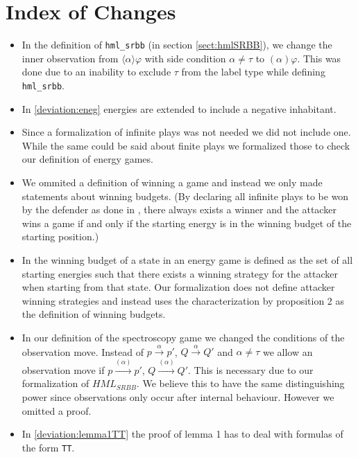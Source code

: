\section{Index of Changes}
\begin{itemize}
    \item In the definition of \texttt{hml\_srbb} (in section \ref{sect:hmlSRBB}), we change the inner observation from
      $\langle\alpha\rangle\varphi$ with side condition $\alpha \neq \tau$ to $(\alpha)\varphi$.
      This was done due to an inability to exclude $\tau$ from the label type while defining \texttt{hml\_srbb}. 
    \item In \ref{deviation:eneg} energies are extended to include a negative inhabitant. 
    \item Since a formalization of infinite plays was not needed we did not include one. While the 
same could be said about finite plays we formalized those to check our definition of energy games.
    \item We ommited a definition of winning a game and instead we only made statements about winning budgets. 
(By declaring all infinite plays to be won by the defender as done in \cite{bisping2023lineartimebranchingtime}, 
there always exists a winner and the attacker wins a game if and only if the starting energy is in the winning budget of the starting position.)
    \item In \cite{bisping2023lineartimebranchingtime} the winning budget of a state in an energy game 
is defined as the set of all starting energies such that there exists a winning strategy for the attacker 
when starting from that state. Our formalization does not define attacker winning strategies and instead 
uses the characterization by proposition 2 \cite[p. 9]{bisping2023lineartimebranchingtime} as the definition of winning budgets.
    \item In our definition of the spectroscopy game we changed the conditions of the observation move. 
Instead of $p \overset{\alpha}{\longrightarrow}p'$, $Q \overset{\alpha}{\longrightarrow} Q'$ and $\alpha \neq \tau$
we allow an observation move if  $p \overset{(\alpha)}{\longrightarrow}p'$, $Q \overset{(\alpha)}{\longrightarrow} Q'$.
This is necessary due to our formalization of $HML_{SRBB}$. We believe this to have the same distinguishing power 
since observations only occur after internal behaviour. However we omitted a proof. 
    \item In \ref{deviation:lemma1TT} the proof of lemma 1 has to deal with formulas of the form \texttt{TT}. 

\end{itemize}
